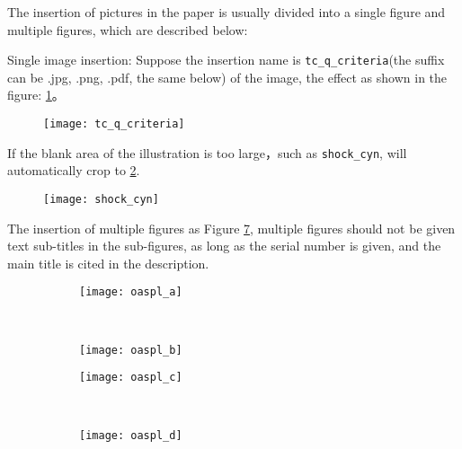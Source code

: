 The insertion of pictures in the paper is usually divided into a single figure and multiple figures, which are described below:

Single image insertion: Suppose the insertion name is \verb|tc_q_criteria|(the suffix can be .jpg, .png, .pdf, the same below) of the image, the effect as shown in the figure:
\ref{fig:tc_q_criteria}。
\begin{figure}[!htbp]
    \centering
    \texttt{[image: tc\_q\_criteria]}
    \label{fig:tc_q_criteria}
\end{figure}

If the blank area of the illustration is too large，such as \verb|shock_cyn|, will automatically crop to \ref{fig:shock_cyn}.
\begin{figure}[!htbp]
    \centering
    \texttt{[image: shock\_cyn]}
    \label{fig:shock_cyn}
\end{figure}

The insertion of multiple figures as Figure \ref{fig:oaspl}, multiple figures should not be given text sub-titles in the sub-figures, as long as the serial number is given, and the main title is cited in the description.
\begin{figure}[!htbp]
    \centering
    \begin{subfigure}[b]{0.35\textwidth}
      \texttt{[image: oaspl\_a]}
      \caption{}
      \label{fig:oaspl_a}
    \end{subfigure}%
    ~%
    \begin{subfigure}[b]{0.35\textwidth}
      \texttt{[image: oaspl\_b]}
      \caption{}
      \label{fig:oaspl_b}
    \end{subfigure}
    \begin{subfigure}[b]{0.35\textwidth}
      \texttt{[image: oaspl\_c]}
      \caption{}
      \label{fig:oaspl_c}
    \end{subfigure}%
    ~%
    \begin{subfigure}[b]{0.35\textwidth}
      \texttt{[image: oaspl\_d]}
      \caption{}
      \label{fig:oaspl_d}
    \end{subfigure}
    \label{fig:oaspl}
\end{figure}

